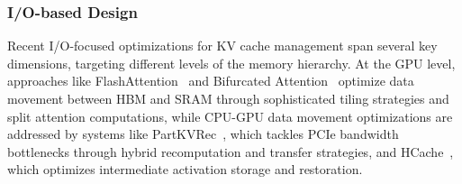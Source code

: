 \subsubsection{I/O-based Design}\label{sec:sys_hd_io}

Recent I/O-focused optimizations for KV cache management span several key dimensions, targeting different levels of the memory hierarchy. At the GPU level, approaches like FlashAttention~\cite{DBLP:conf/nips/DaoFERR22} and Bifurcated Attention~\cite{athiwaratkun2024bifurcatedattentionacceleratingmassively} optimize data movement between HBM and SRAM through sophisticated tiling strategies and split attention computations, while CPU-GPU data movement optimizations are addressed by systems like PartKVRec~\cite{jiang2024efficientllminferenceioaware}, which tackles PCIe bandwidth bottlenecks through hybrid recomputation and transfer strategies, and HCache~\cite{DBLP:journals/corr/abs-2410-05004}, which optimizes intermediate activation storage and restoration. 

